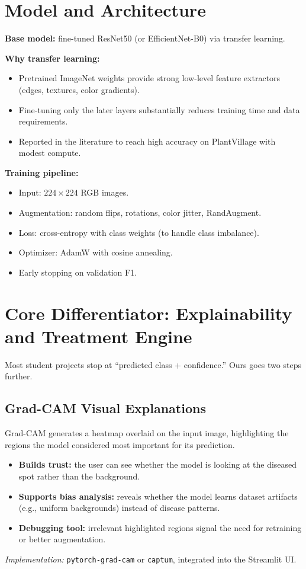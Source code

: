 \documentclass[11pt,a4paper]{article}
\begin{document}
\section{Model and Architecture}
\textbf{Base model:} fine-tuned ResNet50 (or EfficientNet-B0) via transfer learning.

\textbf{Why transfer learning:}
\begin{itemize}
  \item Pretrained ImageNet weights provide strong low-level feature extractors (edges, textures, color gradients).
  \item Fine-tuning only the later layers substantially reduces training time and data requirements.
  \item Reported in the literature to reach high accuracy on PlantVillage with modest compute.
\end{itemize}

\textbf{Training pipeline:}
\begin{itemize}
  \item Input: $224\times224$ RGB images.
  \item Augmentation: random flips, rotations, color jitter, RandAugment.
  \item Loss: cross-entropy with class weights (to handle class imbalance).
  \item Optimizer: AdamW with cosine annealing.
  \item Early stopping on validation F1.
\end{itemize}

\section{Core Differentiator: Explainability and Treatment Engine}
Most student projects stop at ``predicted class + confidence.'' Ours goes two steps further.

\subsection{Grad-CAM Visual Explanations}
Grad-CAM generates a heatmap overlaid on the input image, highlighting the regions the model considered most important for its prediction.
\begin{itemize}
  \item \textbf{Builds trust:} the user can see whether the model is looking at the diseased spot rather than the background.
  \item \textbf{Supports bias analysis:} reveals whether the model learns dataset artifacts (e.g., uniform backgrounds) instead of disease patterns.
  \item \textbf{Debugging tool:} irrelevant highlighted regions signal the need for retraining or better augmentation.
\end{itemize}
\textit{Implementation:} \texttt{pytorch-grad-cam} or \texttt{captum}, integrated into the Streamlit UI.
\end{document}
